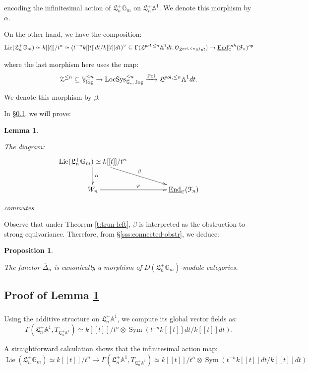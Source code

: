 \documentclass[reqno,11pt]{amsart}
\numberwithin{equation}{subsection}
\newtheorem{lem}[thm]{Lemma}
\newtheorem{prop}[thm]{Proposition}
\theoremstyle{remark}
\newcommand{\xar}[1]{\xrightarrow{#1}}
\newcommand{\bA}{{\mathbb A}}
\newcommand{\bG}{{\mathbb G}}
\newcommand{\sC}{{\EuScript C}}
\newcommand{\sF}{{\EuScript F}}
\newcommand{\sO}{{\EuScript O}}
\newcommand{\sY}{{\EuScript Y}}
\newcommand{\sZ}{{\EuScript Z}}
\newcommand{\fL}{{\mathfrak L}}
\newcommand{\on}{\operatorname}
\newcommand{\ol}[1]{\overline{#1}{}}
\newcommand{\ul}{\underline}
\newcommand{\End}{\on{End}}
\newcommand{\vph}{\varphi}
\newcommand{\Sym}{\on{Sym}}
\newcommand{\LocSys}{\on{LocSys}}
\newcommand{\Lie}{\on{Lie}}
\newcommand{\Pol}{\on{Pol}}
\renewcommand{\subset}{\subseteq}
\begin{document}
\noindent encoding the infinitesimal action of $\fL_n^+\bG_m$ on
$\fL_n^+\bA^1$. We denote this morphism by $\alpha$.

On the other hand, we have the composition:
%
\[
\Lie(\fL_n^+\bG_m) \simeq k[[t]]/t^n \simeq 
(t^{-n} k[[t]]dt/k[[t]] dt)^{\vee} \subset 
\Gamma(\fL^{pol,\leq n} \bA^1 dt,\sO_{\fL^{pol,\leq n} \bA^1 dt})
\to \ul{\End}_{\sC}^{enh}(\sF_n)^{op}
\]

\noindent where the last morphism here uses the map:
%
\[
\sZ^{\leq n} \subset \sY_{\log}^{\leq n} \to \LocSys_{\bG_m,\log}^{\leq n}
\xar{\Pol} \fL^{pol,\leq n} \bA^1 dt.
\]

\noindent We denote this morphism by $\beta$.

In \S \ref{ss:hc-calc-pf}, we will prove:

\begin{lem}\label{l:hc-calc}

The diagram:
%
\[
\xymatrix{
\Lie(\fL_n^+\bG_m) \simeq k[[t]]/t^n \ar[d]^{\alpha} \ar[drr]^{\beta} \\
W_n \ar[rr]^{\vph} && \ul{\End}_{\sC}(\sF_n)
}
\]

\noindent commutes.

\end{lem}

Observe that under Theorem \ref{t:trun-lcft}, $\beta$ is interpreted
as the obstruction to strong equivariance. Therefore, 
from \S \ref{sss:connected-obstr}, we deduce:

\begin{prop}\label{p:eq}

The functor $\ol{\Delta}_n$ is canonically a morphism of
$D(\fL_n^+\bG_m)$-module categories. 

\end{prop}

\subsection{Proof of Lemma \ref{l:hc-calc}}\label{ss:hc-calc-pf}

\subsubsection{}

Using the additive structure on $\fL_n^+\bA^1$,
we compute its global vector fields as:
%
\[
\Gamma(\fL_n^+\bA^1,T_{\fL_n^+\bA^1}) \simeq 
k[[t]]/t^n \otimes \Sym(t^{-n}k[[t]]dt/k[[t]]dt).
\]

\noindent A straightforward calculation shows that the infinitesimal action
map:
%
\[
\Lie(\fL_n^+\bG_m) \simeq k[[t]]/t^n \to \Gamma(\fL_n^+\bA^1,T_{\fL_n^+\bA^1})
\simeq k[[t]]/t^n \otimes \Sym(t^{-n}k[[t]]dt/k[[t]]dt)
\]
\end{document}
